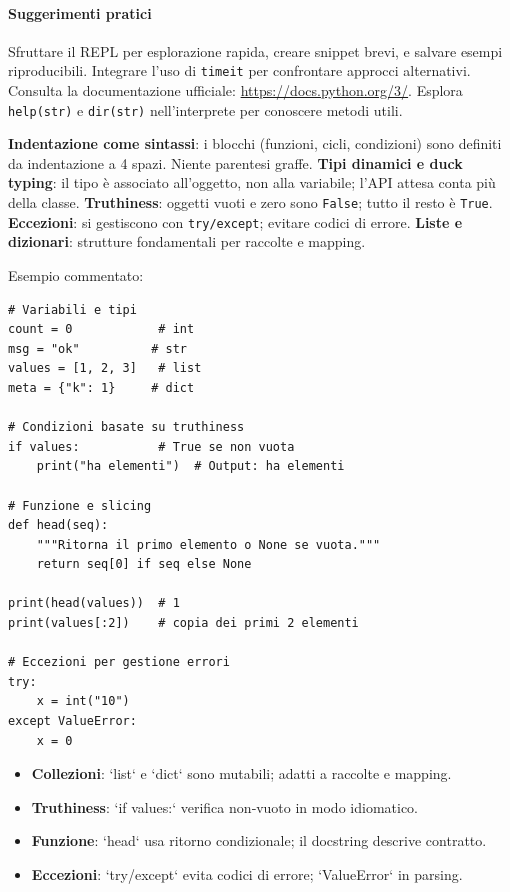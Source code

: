 \paragraph{Suggerimenti pratici} Sfruttare il REPL per esplorazione rapida, creare snippet brevi, e salvare esempi riproducibili. Integrare l'uso di \verb|timeit| per confrontare approcci alternativi.
Consulta la documentazione ufficiale: \url{https://docs.python.org/3/}. Esplora \texttt{help(str)} e \texttt{dir(str)} nell'interprete per conoscere metodi utili.

\begin{tcolorbox}[title=Guida rapida per programmatori non-Python]
	\textbf{Indentazione come sintassi}: i blocchi (funzioni, cicli, condizioni) sono definiti da indentazione a 4 spazi. Niente parentesi graffe.  
	\textbf{Tipi dinamici e duck typing}: il tipo è associato all'oggetto, non alla variabile; l'API attesa conta più della classe.  
	\textbf{Truthiness}: oggetti vuoti e zero sono \texttt{False}; tutto il resto è \texttt{True}.  
	\textbf{Eccezioni}: si gestiscono con \texttt{try/except}; evitare codici di errore.  
	\textbf{Liste e dizionari}: strutture fondamentali per raccolte e mapping.
	
\end{tcolorbox}
Esempio commentato:
\begin{lstlisting}
# Variabili e tipi
count = 0            # int
msg = "ok"          # str
values = [1, 2, 3]   # list
meta = {"k": 1}     # dict

# Condizioni basate su truthiness
if values:           # True se non vuota
    print("ha elementi")  # Output: ha elementi

# Funzione e slicing
def head(seq):
    """Ritorna il primo elemento o None se vuota."""
    return seq[0] if seq else None

print(head(values))  # 1
print(values[:2])    # copia dei primi 2 elementi

# Eccezioni per gestione errori
try:
    x = int("10")
except ValueError:
    x = 0
\end{lstlisting}
\begin{tcolorbox}[title=Spiegazione del codice]
	\begin{itemize}
		\item \textbf{Collezioni}: `list` e `dict` sono mutabili; adatti a raccolte e mapping.  
		\item \textbf{Truthiness}: `if values:` verifica non‑vuoto in modo idiomatico.  
		\item \textbf{Funzione}: `head` usa ritorno condizionale; il docstring descrive contratto.  
		\item \textbf{Eccezioni}: `try/except` evita codici di errore; `ValueError` in parsing.
	\end{itemize}
\end{tcolorbox}
